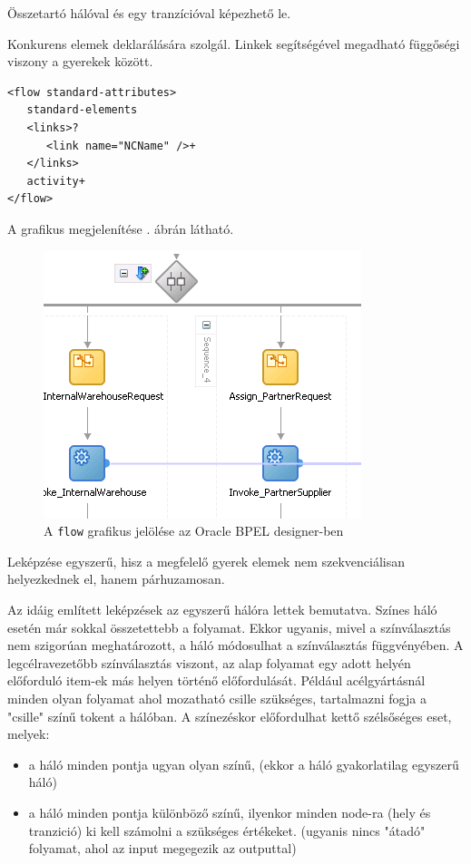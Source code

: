Összetartó hálóval és egy tranzícióval képezhető le.



Konkurens elemek deklarálására szolgál. Linkek segítségével megadható függőségi viszony a gyerekek között. 
\begin{verbatim}
<flow standard-attributes>
   standard-elements
   <links>?
      <link name="NCName" />+
   </links>
   activity+
</flow>
\end{verbatim} 
A grafikus megjelenítése . ábrán látható.

\begin{figure}[h!]
\centering
\includegraphics[scale=1]{images/flow.png}
\caption{A \texttt{flow} grafikus jelölése az Oracle BPEL designer-ben}
\label{fig:flow}
\end{figure}
Leképzése egyszerű, hisz a megfelelő gyerek elemek nem szekvenciálisan helyezkednek el, hanem párhuzamosan.

Az idáig említett leképzések az egyszerű hálóra lettek bemutatva. Színes háló esetén már sokkal összetettebb a folyamat. Ekkor ugyanis, mivel a színválasztás nem szigorúan meghatározott, a háló módosulhat a színválasztás függvényében. A legcélravezetőbb színválasztás viszont, az alap folyamat egy adott helyén előforduló item-ek más helyen történő előfordulását. Például acélgyártásnál minden olyan folyamat ahol mozatható csille szükséges, tartalmazni fogja a "csille" színű tokent a hálóban. A színezéskor előfordulhat kettő szélsőséges eset, melyek:
\begin{itemize}
\item a háló minden pontja ugyan olyan színű, (ekkor a háló gyakorlatilag egyszerű háló)
\item a háló minden pontja különböző színű, ilyenkor minden node-ra (hely és tranzició) ki kell számolni a szükséges értékeket. (ugyanis nincs "átadó" folyamat, ahol az input megegezik az outputtal)
\end{itemize}



